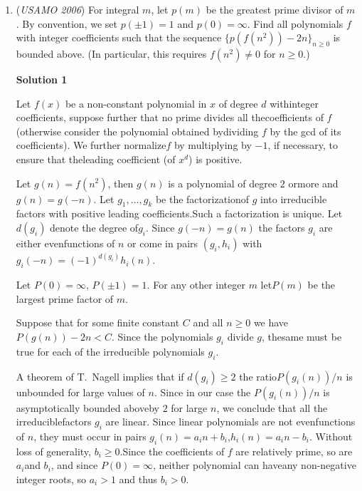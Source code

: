 \begin{enumerate}
 Hence the smallest possible $N$ is $\boxed{ N = 2k^3 + 3k^2 + 3k }$.

 <i>Alternate solutions are always welcome. If you have a different, elegant solution to this problem, please \href{https://artofproblemsolving.com/wiki/index.php?title=2006\_USAMO\_Problems/Problem\_2&action=edit}{add it} to this page.</i>



	\item (\textit{USAMO 2006}) For integral $m$, let $p(m)$ be the greatest prime divisor of $m$. By convention, we set $p(\pm1)=1$ and $p(0)=\infty$. Find all polynomials $f$ with integer coefficients such that the sequence $\lbrace p(f(n^2))-2n\rbrace_{n\ge0}$ is bounded above. (In particular, this requires $f(n^2)\neq0$ for $n\ge0$.)


 



\textbf{Solution 1}

Let $f(x)$ be a non-constant polynomial in $x$ of degree $d$ withinteger coefficients, suppose further that no prime divides all thecoefficients of $f$ (otherwise consider the polynomial obtained bydividing $f$ by the gcd of its coefficients). We further normalize$f$ by multiplying by $-1$, if necessary, to ensure that theleading coefficient (of $x^d$) is positive.

 Let $g(n) = f(n^2)$, then $g(n)$ is a polynomial of degree $2$ ormore and $g(n) = g(-n)$. Let $g_1, \ldots, g_k$ be the factorizationof $g$ into irreducible factors with positive leading coefficients.Such a factorization is unique. Let $d(g_i)$ denote the degree of$g_i$. Since $g(-n) = g(n)$ the factors $g_i$ are either evenfunctions of $n$ or come in pairs $(g_i, h_i)$ with $g_i(-n) = (-1)^{d(g_i)} h_i(n)$.

 Let $P(0) = \infty$, $P(\pm 1) = 1$. For any other integer $m$ let$P(m)$ be the largest prime factor of $m$.

 Suppose that for some finite constant $C$ and all $n \ge 0$ we have$P(g(n)) - 2n < C$. Since the polynomials $g_i$ divide $g$, thesame must be true for each of the irreducible polynomials $g_i$.

 A theorem of T. Nagell implies that if $d(g_i) \ge 2$ the ratio$P(g_i(n))/n$ is unbounded for large values of $n$. Since in our case the $P(g_i(n))/n$ is asymptotically bounded aboveby $2$ for large $n$, we conclude that all the irreduciblefactors $g_i$ are linear. Since linear polynomials are not evenfunctions of $n$, they must occur in pairs $g_i(n) = a_in + b_i$,$h_i(n) = a_in - b_i$. Without loss of generality, $b_i \ge 0$.Since the coefficients of $f$ are relatively prime, so are $a_i$and $b_i$, and since $P(0) = \infty$, neither polynomial can haveany non-negative integer roots, so $a_i > 1$ and thus $b_i > 0$.


\end{enumerate}
